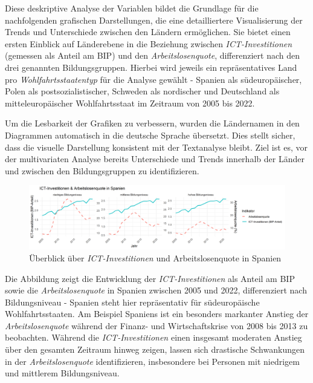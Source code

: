Diese deskriptive Analyse der Variablen bildet die Grundlage für die nachfolgenden 
grafischen Darstellungen, die eine detailliertere Visualisierung der Trends und Unterschiede 
zwischen den Ländern ermöglichen. Sie bietet einen ersten Einblick auf Länderebene in die 
Beziehung zwischen \textit{\ac{ICT}-Investitionen} (gemessen als Anteil am \ac{BIP}) und 
den \textit{Arbeitslosenquote}, differenziert nach den drei genannten Bildungsgruppen. 
Hierbei wird jeweils ein repräsentatives Land pro \textit{Wohlfahrtsstaatentyp} für die 
Analyse gewählt - Spanien als südeuropäischer, Polen als postsozialistischer, Schweden als 
nordischer und Deutschland als mitteleuropäischer Wohlfahrtsstaat im Zeitraum von 2005 bis 2022. 

Um die Lesbarkeit der Grafiken zu verbessern, wurden die Ländernamen in den Diagrammen 
automatisch in die deutsche Sprache übersetzt. Dies stellt sicher, dass die visuelle 
Darstellung konsistent mit der Textanalyse bleibt. Ziel ist es, vor der multivariaten Analyse 
bereits Unterschiede und Trends innerhalb der Länder und zwischen den Bildungsgruppen zu 
identifizieren.

\begin{figure}[htbp]
    \centering
    \includegraphics[width=\textwidth]{assets/plot_spain_final.png}
    \caption{Überblick über \textit{\ac{ICT}-Investitionen} und Arbeitslosenquote in 
    Spanien}
    \label{fig:spain}
\end{figure}

Die Abbildung zeigt die Entwicklung der \textit{\ac{ICT}-Investitionen} als Anteil am 
BIP sowie die \textit{Arbeitslosenquote} in Spanien zwischen 2005 und 2022, differenziert 
nach Bildungsniveau - Spanien steht hier repräsentativ für südeuropäische Wohlfahrtsstaaten. 
Am Beispiel Spaniens ist ein besonders markanter Anstieg der \textit{Arbeitslosenquote} 
während der Finanz- und Wirtschaftskrise von 2008 bis 2013 zu beobachten. Während die 
\textit{\ac{ICT}-Investitionen} einen insgesamt moderaten Anstieg über den gesamten 
Zeitraum hinweg zeigen, lassen sich drastische Schwankungen in der 
\textit{Arbeitslosenquote} identifizieren, insbesondere bei Personen mit niedrigem und 
mittlerem Bildungsniveau.


